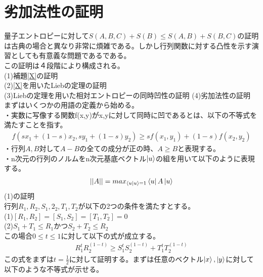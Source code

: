 \documentclass[a4paper,10.5pt]{article}
\numberwithin{equation}{section}
\begin{document}
\appendix
\section{劣加法性の証明}
量子エントロピーに対して$ S(A,B,C)+S(B) \leq S(A,B) +S(B,C)$の証明は古典の場合と異なり非常に煩雑である。しかし行列関数に対する凸性を示す演習としても有意義な問題であるである。\\
この証明は４段階により構成される。\\
(1)補題\eqref{X}の証明\\
(2)\eqref{X}を用いたLiebの定理の証明\\
(3)Liebの定理を用いた相対エントロピーの同時凹性の証明
(4)劣加法性の証明\\
まずはいくつかの用語の定義から始める。\\
・実数に写像する関数f(x,y)がx,yに対して同時に凹であるとは、以下の不等式を満たすことを指す。
\begin{equation}\begin{split}
    f(sx_{1}+(1-s)x_{2},sy_{1}+(1-s)y_{2}) \geq sf(x_{1},y_{1})+(1-s)f(x_{2},y_{2})
\end{split} \end{equation}
・行列$A,B$対して$A-B$の全ての成分が正の時、$A\geq B$と表現する。\\
・n次元の行列のノルムをn次元基底ベクトル$\ket{u}$の組を用いて以下のように表現する。\\
\begin{equation}\begin{split}
    ||A||=max_{\bra{u}\ket{u}=1}\bra{u}A\ket{u}
\end{split} \end{equation}
(1)の証明\\
行列$R_{1},R_{2},S_{1},2_{2},T_{1},T_{2}$が以下の2つの条件を満たすとする。\\
(1)$[R_{1},R_{2}]=[S_{1},S_{2}]=[T_{1},T_{2}]=0$\\
(2)$S_{1}+T_{1}\leq R_{1}$かつ$S_{2}+T_{2}\leq R_{2}$\\
この場合$0\leq t \leq 1$に対して以下の式が成立する。
\begin{equation}\begin{split}
    R_{1}^{t}R_{2}^{(1-t)}\geq S_{1}^{t}S_{2}^{(1-t)} + T_{1}^{t}T_{2}^{(1-t)}\label{X}
\end{split} \end{equation}
この式をまずは$t=\frac{1}{2}$に対して証明する。まずは任意のベクトル$\ket{x},\ket{y}$に対して以下のような不等式が示せる。
\end{document}
